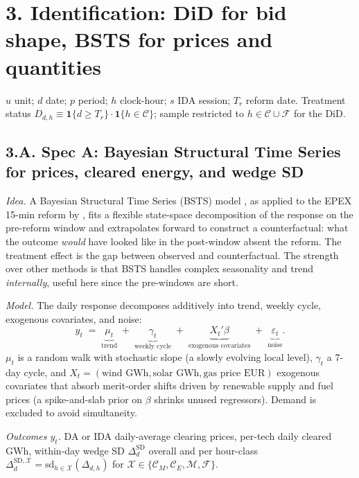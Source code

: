 \documentclass[11pt]{article}
\begin{document}
\section*{3. Identification: DiD for bid shape, BSTS for prices and quantities}
\label{sec:identification}

$u$ unit; $d$ date; $p$ period; $h$ clock-hour; $s$ IDA session; $T_r$ reform date. Treatment status $D_{d,h} \equiv \mathbf{1}\{d\ge T_r\}\cdot\mathbf{1}\{h\in\mathcal{C}\}$; sample restricted to $h\in\mathcal{C}\cup\mathcal{F}$ for the DiD.

\subsection*{3.A. Spec A: Bayesian Structural Time Series for prices, cleared energy, and wedge SD}\label{sec:bsts}

\emph{Idea.} A Bayesian Structural Time Series (BSTS) model \citep{brodersen_2015}, as applied to the EPEX 15-min reform by \citet{markle_huss_2017}, fits a flexible state-space decomposition of the response on the pre-reform window and extrapolates forward to construct a counterfactual: what the outcome \emph{would} have looked like in the post-window absent the reform. The treatment effect is the gap between observed and counterfactual. The strength over other methods is that BSTS handles complex seasonality and trend \emph{internally}, useful here since the pre-windows are short.

\emph{Model.} The daily response decomposes additively into trend, weekly cycle, exogenous covariates, and noise:
\[
y_t \;=\; \underbrace{\mu_t}_{\text{trend}} \;+\; \underbrace{\gamma_t}_{\text{weekly cycle}} \;+\; \underbrace{X_t'\beta}_{\text{exogenous covariates}} \;+\; \underbrace{\varepsilon_t}_{\text{noise}}.
\]
$\mu_t$ is a random walk with stochastic slope (a slowly evolving local level), $\gamma_t$ a 7-day cycle, and $X_t = (\text{wind GWh}, \text{solar GWh}, \text{gas price EUR})$ exogenous covariates that absorb merit-order shifts driven by renewable supply and fuel prices (a spike-and-slab prior on $\beta$ shrinks unused regressors). Demand is excluded to avoid simultaneity.

\emph{Outcomes $y_t$.} DA or IDA daily-average clearing prices, per-tech daily cleared GWh, within-day wedge SD $\Delta^{\text{SD}}_d$ overall and per hour-class $\Delta^{\text{SD},\mathcal{X}}_d = \mathrm{sd}_{h\in\mathcal{X}}(\Delta_{d,h})$ for $\mathcal{X}\in\{\mathcal{C}_M, \mathcal{C}_E, \mathcal{M},\mathcal{F}\}$.
\end{document}
